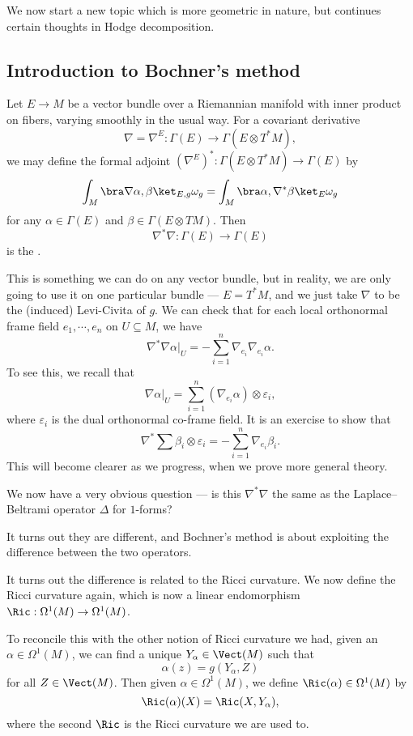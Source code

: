 \documentclass[a4paper]{article}
\begin{document}
We now start a new topic which is more geometric in nature, but continues certain thoughts in Hodge decomposition.

\subsection{Introduction to Bochner's method}
Let $E \to M$ be a vector bundle over a Riemannian manifold with inner product on fibers, varying smoothly in the usual way. For a covariant derivative
\[
  \nabla = \nabla^E: \Gamma(E) \to \Gamma(E \otimes T^*M),
\]
we may define the formal adjoint $(\nabla^E)^*: \Gamma(E \otimes T^* M) \to \Gamma(E)$ by
\[
  \int_M \bra \nabla \alpha, \beta\ket_{E, g} \omega_g = \int_M \bra \alpha, \nabla^* \beta\ket_E \omega_g
\]
for any $\alpha \in \Gamma(E)$ and $\beta \in \Gamma(E \otimes T M)$. Then
\[
  \nabla^* \nabla : \Gamma(E) \to \Gamma(E)
\]
is the .

This is something we can do on any vector bundle, but in reality, we are only going to use it on one particular bundle --- $E = T^*M$, and we just take $\nabla$ to be the (induced) Levi-Civita of $g$. We can check that for each local orthonormal frame field $e_1, \cdots, e_n$ on $U \subseteq M$, we have
\[
  \nabla^* \nabla \alpha |_U = -\sum_{i = 1}^n \nabla_{e_i} \nabla_{e_i} \alpha.
\]
To see this, we recall that
\[
  \nabla \alpha |_U = \sum_{i = 1}^n (\nabla_{e_i} \alpha) \otimes \varepsilon_i,
\]
where $\varepsilon_i$ is the dual orthonormal co-frame field. It is an exercise to show that
\[
  \nabla^* \sum \beta_i \otimes \varepsilon_i = - \sum_{i = 1}^n \nabla_{e_i}\beta_i.
\]
This will become clearer as we progress, when we prove more general theory.

We now have a very obvious question --- is this $\nabla^* \nabla$ the same as the Laplace--Beltrami operator $\Delta$ for $1$-forms?

It turns out they are different, and Bochner's method is about exploiting the difference between the two operators.

It turns out the difference is related to the Ricci curvature. We now define the Ricci curvature again, which is now a linear endomorphism $\Ric: \Omega^1(M) \to \Omega^1(M)$.

To reconcile this with the other notion of Ricci curvature we had, given an $\alpha \in \Omega^1(M)$, we can find a unique $Y_\alpha \in \Vect(M)$ such that
\[
  \alpha(z) = g(Y_\alpha, Z)
\]
for all $Z \in \Vect(M)$. Then given $\alpha \in \Omega^1(M)$, we define $\Ric(\alpha) \in \Omega^1(M)$ by
\[
  \Ric(\alpha)(X) = \Ric(X, Y_\alpha),
\]
where the second $\Ric$ is the Ricci curvature we are used to.\index{$\Ric$}
\end{document}
